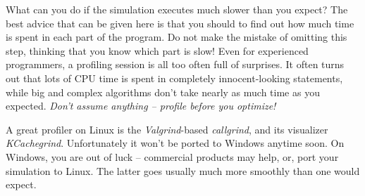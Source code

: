 What can you do if the simulation executes much slower than you expect?
The best advice that can be given here is that you should
 to find out how much time is spent in each
part of the program. Do not make the mistake of omitting this step,
thinking that you know which part is slow! Even for experienced
programmers, a profiling session is all too often full of surprises.
It often turns out that lots of CPU time is spent in completely
innocent-looking statements, while big and complex algorithms
don't take nearly as much time as you expected. \textit{Don't assume anything
-- profile before you optimize!}

A great profiler on Linux is the \textit{Valgrind}-based
\textit{callgrind}, and its visualizer \textit{KCachegrind}.
Unfortunately it won't be ported to Windows anytime soon.
On Windows, you are out of luck -- commercial products may help, or,
port your simulation to Linux. The latter goes usually much more smoothly
than one would expect.

